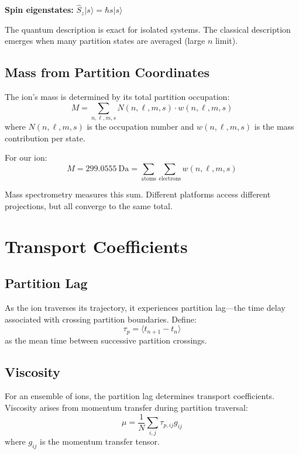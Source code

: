 \documentclass[twocolumn,10pt]{article}
\theoremstyle{remark}
\begin{document}
\textbf{Spin eigenstates:} $\hat{S}_z|s\rangle = \hbar s|s\rangle$

The quantum description is exact for isolated systems. The classical description emerges when many partition states are averaged (large $n$ limit).

\subsection{Mass from Partition Coordinates}

The ion's mass is determined by its total partition occupation:
\begin{equation}
M = \sum_{n,\ell,m,s} N(n,\ell,m,s) \cdot w(n,\ell,m,s)
\end{equation}
where $N(n,\ell,m,s)$ is the occupation number and $w(n,\ell,m,s)$ is the mass contribution per state.

For our ion:
\begin{equation}
M = 299.0555~\text{Da} = \sum_{\text{atoms}} \sum_{\text{electrons}} w(n,\ell,m,s)
\end{equation}

Mass spectrometry measures this sum. Different platforms access different projections, but all converge to the same total.


\section{Transport Coefficients}
\label{sec:transport}

\subsection{Partition Lag}

As the ion traverses its trajectory, it experiences partition lag---the time delay associated with crossing partition boundaries. Define:
\begin{equation}
\tau_p = \langle t_{n+1} - t_n \rangle
\end{equation}
as the mean time between successive partition crossings.

\subsection{Viscosity}

For an ensemble of ions, the partition lag determines transport coefficients. Viscosity arises from momentum transfer during partition traversal:
\begin{equation}
\mu = \frac{1}{N} \sum_{i,j} \tau_{p,ij} g_{ij}
\end{equation}
where $g_{ij}$ is the momentum transfer tensor.
\end{document}

